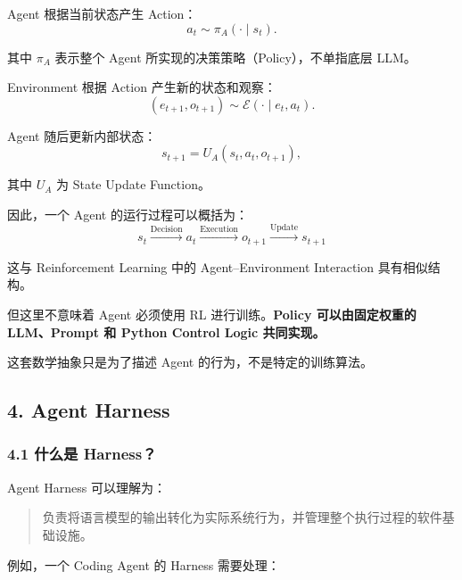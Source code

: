 Agent 根据当前状态产生 Action：
\[a_t\sim\pi_A(\cdot\mid s_t).\]

其中 \(\pi_A\) 表示整个 Agent 所实现的决策策略（Policy），不单指底层 LLM。

Environment 根据 Action 产生新的状态和观察：
\[(e_{t+1},o_{t+1})
\sim
\mathcal E(\cdot\mid e_t,a_t).\]

Agent 随后更新内部状态：
\[s_{t+1}
=
U_A(s_t,a_t,o_{t+1}),\]

其中 \(U_A\) 为 State Update Function。

因此，一个 Agent 的运行过程可以概括为：
\[\boxed{
s_t
\xrightarrow{\text{Decision}}
a_t
\xrightarrow{\text{Execution}}
o_{t+1}
\xrightarrow{\text{Update}}
s_{t+1}
}\]

这与 Reinforcement Learning 中的 Agent--Environment Interaction 具有相似结构。

但这里不意味着 Agent 必须使用 RL 进行训练。\textbf{Policy 可以由固定权重的 LLM、Prompt 和 Python Control Logic 共同实现。}

这套数学抽象只是为了描述 Agent 的行为，不是特定的训练算法。

\hypertarget{part-3-31-0001-agent-harness}{%
\subsection{4. Agent Harness}\label{part-3-31-0001-agent-harness}}

\hypertarget{part-3-31-0001-ux4ec0ux4e48ux662f-harness}{%
\subsubsection{4.1 什么是 Harness？}\label{part-3-31-0001-ux4ec0ux4e48ux662f-harness}}

Agent Harness 可以理解为：

\begin{quote}
负责将语言模型的输出转化为实际系统行为，并管理整个执行过程的软件基础设施。
\end{quote}

例如，一个 Coding Agent 的 Harness 需要处理：

